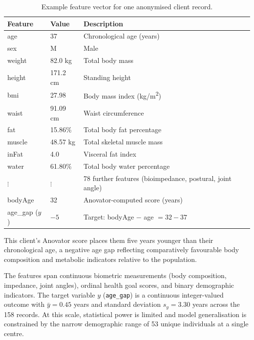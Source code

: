 \documentclass[11pt,a4paper]{report}
\begin{document}
\begin{table}[h]
\centering
\caption{Example feature vector for one anonymised client record.}
\label{tab:sample_record}
\begin{tabular}{lll}
\toprule
\textbf{Feature} & \textbf{Value} & \textbf{Description} \\
\midrule
age    & 37          & Chronological age (years) \\
sex    & M           & Male \\
weight & 82.0 kg     & Total body mass \\
height & 171.2 cm    & Standing height \\
bmi    & 27.98       & Body mass index (kg/m\textsuperscript{2}) \\
waist  & 91.09 cm    & Waist circumference \\
fat    & 15.86\%     & Total body fat percentage \\
muscle & 48.57 kg    & Total skeletal muscle mass \\
inFat  & 4.0         & Visceral fat index \\
water  & 61.80\%     & Total body water percentage \\
$\vdots$ & $\vdots$ & 78 further features (bioimpedance, postural, joint angle) \\
\midrule
bodyAge        & 32   & Anovator-computed score (years) \\
age\_gap ($y$) & $-5$ & Target: bodyAge $-$ age $= 32 - 37$ \\
\bottomrule
\end{tabular}
\end{table}

This client's Anovator score places them five years younger than their chronological age, a negative
age gap reflecting comparatively favourable body composition and metabolic indicators relative to
the population.

The features span continuous biometric measurements (body
composition, impedance, joint angles), ordinal health goal scores, and binary demographic
indicators. The target variable $y$ (\texttt{age\_gap}) is a continuous integer-valued outcome with $\bar{y} = 0.45$ years and standard deviation $s_y = 3.30$ years across the 158 records. At this scale, statistical
power is limited and model generalisation is constrained by the narrow demographic range of 53
unique individuals at a single centre.
\end{document}
